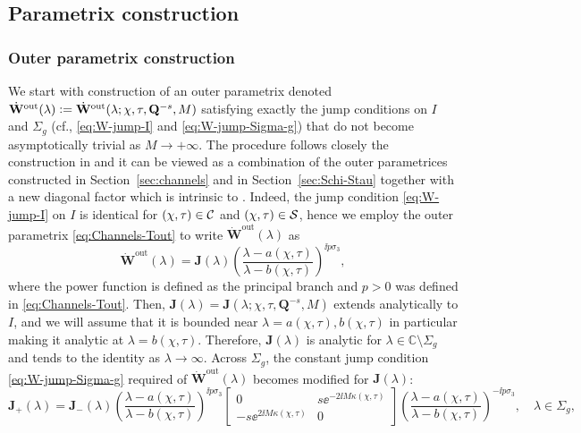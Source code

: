 \subsection{Parametrix construction}
\subsubsection{Outer parametrix construction} 
We start with construction of an outer parametrix denoted $\dot{\mathbf{W}}^\mathrm{out}(\lambda)\vcentcolon= \dot{\mathbf{W}}^\mathrm{out}(\lambda;\chi,\tau,\mathbf{Q}^{-s},M)$ satisfying exactly the jump conditions on $I$ and $\Sigma_g$ (cf., \eqref{eq:W-jump-I} and \eqref{eq:W-jump-Sigma-g}) that do not become asymptotically trivial as $M\to +\infty$. The procedure follows closely the construction in \cite[Section 4.2.2]{BilmanLM20} and it can be viewed as a combination of the outer parametrices constructed in Section~\ref{sec:channels} and in Section~\ref{sec:Schi-Stau} together with a new diagonal factor which is intrinsic to \shelves. Indeed, the jump condition \eqref{eq:W-jump-I} on $I$ is identical for $(\chi,\tau)\in\mathcal{C}$ and $(\chi,\tau)\in\mathcal{S}$, hence we employ the outer parametrix \eqref{eq:Channels-Tout} to write $\dot{\mathbf{W}}^\mathrm{out}(\lambda)$ as
\begin{equation}
\dot{\mathbf{W}}^\mathrm{out}(\lambda)=\mathbf{J}(\lambda)\left(\frac{\lambda-a(\chi,\tau)}{\lambda-b(\chi,\tau)}\right)^{\ii p\sigma_3},
\label{eq:W-out-G}
\end{equation}
where the power function is defined as the principal branch and $p>0$ was defined in \eqref{eq:Channels-Tout}.
Then, $\mathbf{J}(\lambda)=\mathbf{J}(\lambda;\chi,\tau,\mathbf{Q}^{-s},M)$ extends analytically to $I$, and we will assume that it is bounded near $\lambda=a(\chi,\tau),b(\chi,\tau)$ in particular making it analytic at $\lambda=b(\chi,\tau)$.  Therefore, $\mathbf{J}(\lambda)$ is analytic for $\lambda\in\mathbb{C}\setminus\Sigma_g$ and tends to the identity as $\lambda\to\infty$.
Across $\Sigma_g$, the constant jump condition \eqref{eq:W-jump-Sigma-g} required of $\dot{\mathbf{W}}^\mathrm{out}(\lambda)$ becomes modified for $\mathbf{J}(\lambda)$:
\begin{equation}
\mathbf{J}_+(\lambda)=\mathbf{J}_-(\lambda)\left(\frac{\lambda-a(\chi,\tau)}{\lambda-b(\chi,\tau)}\right)^{\ii p\sigma_3}
\begin{bmatrix}0 & s \ee^{-2\ii M\kappa(\chi,\tau)}\\
- s \ee^{ 2\ii M\kappa(\chi,\tau)} & 0\end{bmatrix}
\left(\frac{\lambda-a(\chi,\tau)}{\lambda-b(\chi,\tau)}\right)^{-\ii p\sigma_3},\quad \lambda\in \Sigma_g,
\end{equation}
